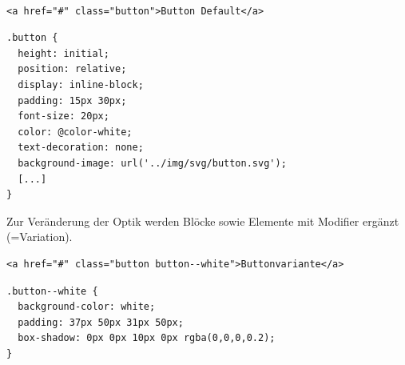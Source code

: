 \begin{figure}[ht]

\end{figure}
\\
\begin{lstlisting}[style=htmlcssjs, backgroundcolor = \color{lightgray},
caption=BEM -- Block Default (HTML)] 
<a href="#" class="button">Button Default</a>
\end{lstlisting}

\begin{lstlisting}[style=htmlcssjs, backgroundcolor = \color{lightgray},
caption=BEM -- Block Default (CSS)]
.button {
  height: initial;
  position: relative;
  display: inline-block;
  padding: 15px 30px;
  font-size: 20px;
  color: @color-white;
  text-decoration: none;
  background-image: url('../img/svg/button.svg');
  [...]
}
\end{lstlisting}

Zur Veränderung der Optik werden Blöcke sowie Elemente mit Modifier ergänzt
(=Variation).

\begin{figure}[ht]

\end{figure}

\begin{lstlisting}[style=htmlcssjs, backgroundcolor = \color{lightgray},
caption=BEM -- Block mit Modifier (HTML)]
<a href="#" class="button button--white">Buttonvariante</a>
\end{lstlisting}

\begin{lstlisting}[style=htmlcssjs, backgroundcolor = \color{lightgray},
caption=BEM -- Modifier (CSS)] 
.button--white {
  background-color: white;
  padding: 37px 50px 31px 50px;
  box-shadow: 0px 0px 10px 0px rgba(0,0,0,0.2);
}

\end{lstlisting}

